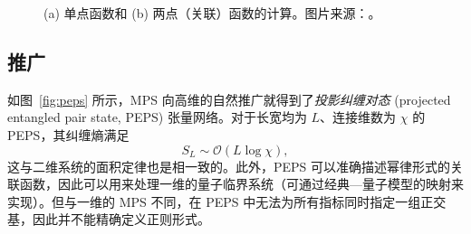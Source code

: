 \begin{figure}[htb]
  \centering
   \quad
  \caption[单点函数和两点关联函数的计算]{(a) 单点函数和 (b) 两点（关联）函数的计算。图片来源：\parencite{orus2008infinite}。}
  \label{fig:expectation-value}
\end{figure}

\subsection{推广}
\label{subsec:mps-generalization}

如图~\ref{fig:peps} 所示，MPS 向高维的自然推广就得到了\emph{投影纠缠对态} (projected entangled pair state, PEPS)\cite{verstraete2004renormalization,orus2014practical,cirac2021matrix} 张量网络。对于长宽均为 $L$、连接维数为 $\chi$ 的 PEPS，其纠缠熵满足
\begin{equation}
  S_L \sim \mathcal{O}(L\log\chi),
\end{equation}
这与二维系统的面积定律也是相一致的。此外，PEPS 可以准确描述幂律形式的关联函数，因此可以用来处理一维的量子临界系统（可通过经典—量子模型的映射来实现）。但与一维的 MPS 不同，在 PEPS 中无法为所有指标同时指定一组正交基，因此并不能精确定义正则形式。

